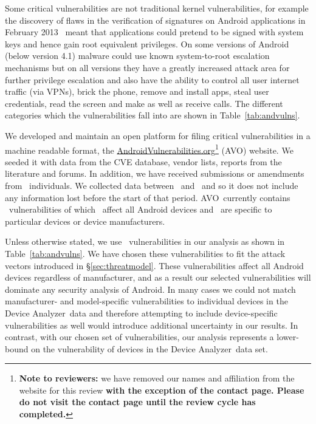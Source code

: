 \documentclass{llncs}
\newcommand{\da}{Device Analyzer}
\newcommand{\avo}{AVO}
\begin{document}
Some critical vulnerabilities are not traditional kernel vulnerabilities, for example the discovery of flaws in the verification of signatures on Android applications in February 2013~\cite{Forristal2013} meant that applications could pretend to be signed with system keys and hence gain root equivalent privileges.
On some versions of Android (below version 4.1) malware could use known system-to-root escalation mechanisms but on all versions they have a greatly increased attack area for further privilege escalation and also have the ability to control all user internet traffic (via VPNs), brick the phone, remove and install apps, steal user credentials, read the screen and make as well as receive calls.
The different categories which the vulnerabilities fall into are shown in Table~\ref{tab:andvulns}.
\avoTabAndVulns

We developed and maintain an open platform for filing critical vulnerabilities in a machine readable format, the \href{http://androidvulnerabilities.org/}{AndroidVulnerabilities.org}\footnote{\textbf{Note to reviewers:} we have removed our names and affiliation from the website for this review \textbf{with the exception of the contact page. Please do not visit the contact page until the review cycle has completed.}\vspace{-4em}} (\avo) website.
We seeded it with data from the CVE database, vendor lists, reports from the literature and forums.
In addition, we have received submissions or amendments from \avoNumSubmitters\ individuals.
We collected data between \avoStartDate\ and \avoEndDate\ and so it does not include any information lost before the start of that period.
\avo\ currently contains \avoNumVulnerabilities\ vulnerabilities of which \avoNumVulnAllAndroid\ affect all Android devices and \avoNumVulnSpecific\ are specific to particular devices or device manufacturers.

Unless otherwise stated, we use \daNumVulnsUsed\ vulnerabilities in our analysis as shown in Table~\ref{tab:andvulns}.
We have chosen these vulnerabilities to fit the attack vectors introduced in \S\ref{sec:threatmodel}.
These vulnerabilities affect all Android devices regardless of manufacturer, and as a result our selected vulnerabilities will dominate any security analysis of Android.
In many cases we could not match manufacturer- and model-specific vulnerabilities to individual devices in the \da\ data and therefore attempting to include device-specific vulnerabilities as well would introduce additional uncertainty in our results.
In contrast, with our chosen set of vulnerabilities, our analysis represents a lower-bound on the vulnerability of devices in the \da\ data set.
\end{document}

